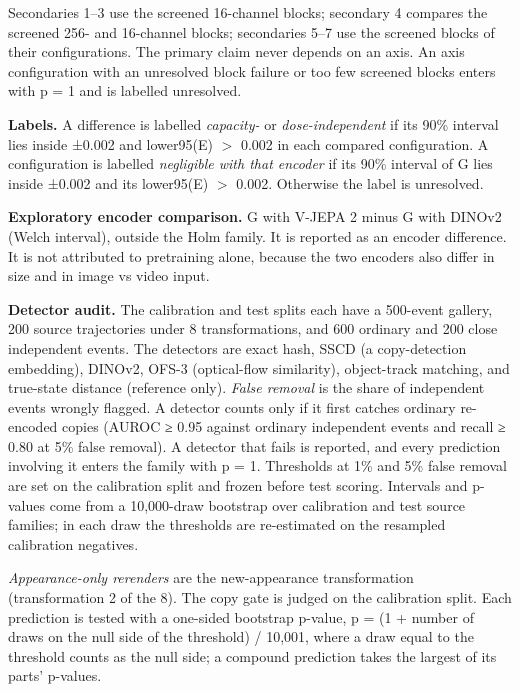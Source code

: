 \documentclass[10pt,letterpaper]{article}
\begin{document}
Secondaries 1--3 use the screened 16-channel blocks;
secondary 4 compares the screened 256- and 16-channel
blocks; secondaries 5--7 use the screened blocks of their
configurations. The primary claim never depends on an axis.
An axis configuration with an unresolved block failure or
too few screened blocks enters with p = 1 and is labelled
unresolved.

\textbf{Labels.} A difference is labelled \emph{capacity-}
or \emph{dose-independent} if its 90\% interval lies inside
±0.002 and lower95(E) \ensuremath{>} 0.002 in each compared
configuration. A configuration is labelled \emph{negligible
with that encoder} if its 90\% interval of G lies inside
±0.002 and its lower95(E) \ensuremath{>} 0.002. Otherwise
the label is unresolved.

\textbf{Exploratory encoder comparison.} G with V-JEPA 2
minus G with DINOv2 (Welch interval), outside the Holm
family. It is reported as an encoder difference. It is not
attributed to pretraining alone, because the two encoders
also differ in size and in image vs video input.

\textbf{Detector audit.} The calibration and test splits
each have a 500-event gallery, 200 source trajectories under
8 transformations, and 600 ordinary and 200 close
independent events. The detectors are exact hash, SSCD (a
copy-detection embedding), DINOv2, OFS-3 (optical-flow
similarity), object-track matching, and true-state distance
(reference only). \emph{False removal} is the share of
independent events wrongly flagged. A detector counts only
if it first catches ordinary re-encoded copies (AUROC ≥ 0.95
against ordinary independent events and recall ≥ 0.80 at 5\%
false removal). A detector that fails is reported, and every
prediction involving it enters the family with p = 1.
Thresholds at 1\% and 5\% false removal are set on the
calibration split and frozen before test scoring. Intervals
and p-values come from a 10,000-draw bootstrap over
calibration and test source families; in each draw the
thresholds are re-estimated on the resampled calibration
negatives.

\emph{Appearance-only rerenders} are the new-appearance
transformation (transformation 2 of the 8). The copy gate is
judged on the calibration split. Each prediction is tested
with a one-sided bootstrap p-value, p = (1 + number of draws
on the null side of the threshold) / 10,001, where a draw
equal to the threshold counts as the null side; a compound
prediction takes the largest of its parts' p-values.
\end{document}
